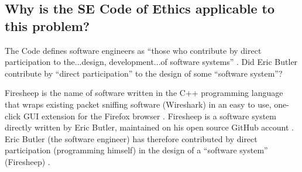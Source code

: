 \documentclass[11pt]{article}
\begin{document}
\begin{multicols}{2}


\subsection{Why is the SE Code of Ethics applicable to this problem?}
The Code defines software engineers as ``those who contribute by direct participation to the...design, development...of software systems'' \cite{se-code}. Did Eric Butler contribute by ``direct participation'' to the design of some ``software system''?

Firesheep is the name of software written in the C++ programming language that wraps existing packet sniffing software (Wireshark) in an easy to use, one-click GUI extension for the Firefox browser \cite{firesheep}. Firesheep is a software system directly written by Eric Butler, maintained on his open source GitHub account \cite{firesheep-source}. Eric Butler (the software engineer) has therefore contributed by direct participation (programming himself) in the design of a ``software system'' (Firesheep) \cite{firesheep}.


\end{multicols}
\end{document}
